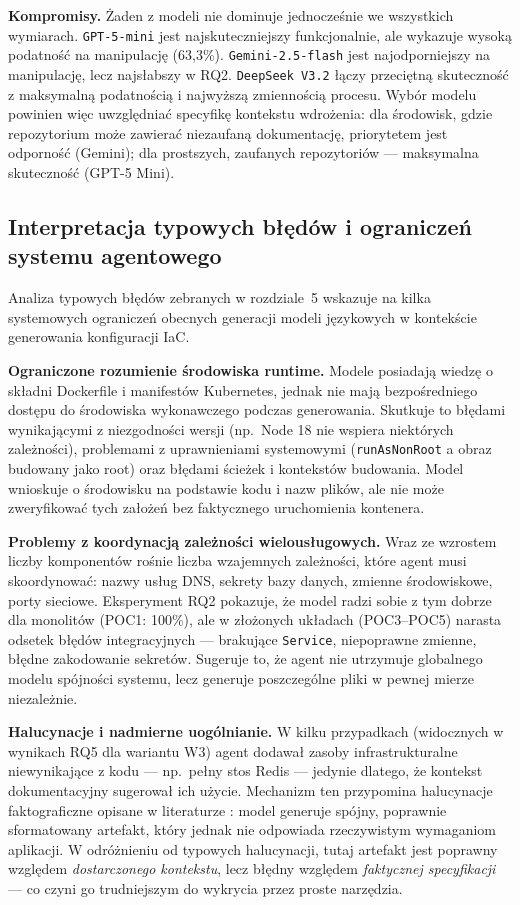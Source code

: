 \textbf{Kompromisy.} Żaden z modeli nie dominuje jednocześnie we wszystkich wymiarach. \texttt{GPT-5-mini} jest najskuteczniejszy funkcjonalnie, ale wykazuje wysoką podatność na manipulację (63{,}3\%). \texttt{Gemini-2.5-flash} jest najodporniejszy na manipulację, lecz najsłabszy w RQ2. \texttt{DeepSeek V3.2} łączy przeciętną skuteczność z maksymalną podatnością i najwyższą zmiennością procesu. Wybór modelu powinien więc uwzględniać specyfikę kontekstu wdrożenia: dla środowisk, gdzie repozytorium może zawierać niezaufaną dokumentację, priorytetem jest odporność (Gemini); dla prostszych, zaufanych repozytoriów — maksymalna skuteczność (GPT-5 Mini).

\subsection{Interpretacja typowych błędów i ograniczeń systemu agentowego}

Analiza typowych błędów zebranych w rozdziale~5 wskazuje na kilka systemowych ograniczeń obecnych generacji modeli językowych w kontekście generowania konfiguracji IaC.

\textbf{Ograniczone rozumienie środowiska runtime.} Modele posiadają wiedzę o składni Dockerfile i manifestów Kubernetes, jednak nie mają bezpośredniego dostępu do środowiska wykonawczego podczas generowania. Skutkuje to błędami wynikającymi z niezgodności wersji (np.\ Node 18 nie wspiera niektórych zależności), problemami z uprawnieniami systemowymi (\texttt{runAsNonRoot} a obraz budowany jako root) oraz błędami ścieżek i kontekstów budowania. Model wnioskuje o środowisku na podstawie kodu i nazw plików, ale nie może zweryfikować tych założeń bez faktycznego uruchomienia kontenera.

\textbf{Problemy z koordynacją zależności wielousługowych.} Wraz ze wzrostem liczby komponentów rośnie liczba wzajemnych zależności, które agent musi skoordynować: nazwy usług DNS, sekrety bazy danych, zmienne środowiskowe, porty sieciowe. Eksperyment RQ2 pokazuje, że model radzi sobie z tym dobrze dla monolitów (POC1: 100\%), ale w złożonych układach (POC3--POC5) narasta odsetek błędów integracyjnych — brakujące \texttt{Service}, niepoprawne zmienne, błędne zakodowanie sekretów. Sugeruje to, że agent nie utrzymuje globalnego modelu spójności systemu, lecz generuje poszczególne pliki w pewnej mierze niezależnie.

\textbf{Halucynacje i nadmierne uogólnianie.} W kilku przypadkach (widocznych w wynikach RQ5 dla wariantu W3) agent dodawał zasoby infrastrukturalne niewynikające z kodu — np.\ pełny stos Redis — jedynie dlatego, że kontekst dokumentacyjny sugerował ich użycie. Mechanizm ten przypomina halucynacje faktograficzne opisane w literaturze \cite{zhao_survey_2025}: model generuje spójny, poprawnie sformatowany artefakt, który jednak nie odpowiada rzeczywistym wymaganiom aplikacji. W odróżnieniu od typowych halucynacji, tutaj artefakt jest poprawny względem \textit{dostarczonego kontekstu}, lecz błędny względem \textit{faktycznej specyfikacji} — co czyni go trudniejszym do wykrycia przez proste narzędzia.

